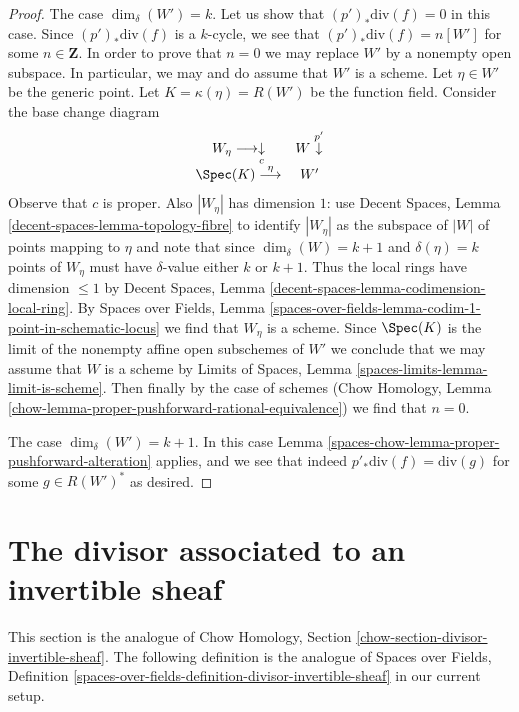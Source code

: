 \begin{proof}
\medskip\noindent
The case $\dim_\delta(W') = k$. Let us show that $(p')_*\text{div}(f) = 0$
in this case. Since $(p')_*\text{div}(f)$ is a $k$-cycle, we see
that $(p')_*\text{div}(f) = n[W']$ for some $n \in \mathbf{Z}$.
In order to prove that $n = 0$ we may replace $W'$ by
a nonempty open subspace. In particular, we may and
do assume that $W'$ is a scheme. Let $\eta \in W'$ be the generic point.
Let $K = \kappa(\eta) = R(W')$ be the function field.
Consider the base change diagram
$$
\begin{array}{cc}W_\eta \longrightarrow\underset{c}{\downarrow} & W \overset{p'}{\downarrow} \\ \Spec(K) \overset{\eta}{\longrightarrow} & W'\end{array}
$$
Observe that $c$ is proper. Also $|W_\eta|$ has dimension $1$:
use Decent Spaces, Lemma \ref{decent-spaces-lemma-topology-fibre}
to identify $|W_\eta|$ as the subspace of $|W|$ of points mapping to $\eta$
and note that since $\dim_\delta(W) = k + 1$ and $\delta(\eta) = k$
points of $W_\eta$ must have $\delta$-value either $k$ or $k + 1$.
Thus the local rings have dimension $\leq 1$ by
Decent Spaces, Lemma \ref{decent-spaces-lemma-codimension-local-ring}.
By Spaces over Fields, Lemma
\ref{spaces-over-fields-lemma-codim-1-point-in-schematic-locus}
we find that $W_\eta$ is a scheme.
Since $\Spec(K)$ is the limit of the nonempty affine open subschemes of $W'$
we conclude that we may assume that $W$ is a scheme by
Limits of Spaces, Lemma \ref{spaces-limits-lemma-limit-is-scheme}.
Then finally by the case of schemes
(Chow Homology, Lemma \ref{chow-lemma-proper-pushforward-rational-equivalence})
we find that $n = 0$.

\medskip\noindent
The case $\dim_\delta(W') = k + 1$. In this case
Lemma \ref{spaces-chow-lemma-proper-pushforward-alteration} applies,
and we see that indeed $p'_*\text{div}(f) = \text{div}(g)$
for some $g \in R(W')^*$ as desired.
\end{proof}

\section{The divisor associated to an invertible sheaf}
\label{spaces-chow-section-divisor-invertible-sheaf}
This section is the analogue of
Chow Homology, Section \ref{chow-section-divisor-invertible-sheaf}.
The following definition is the analogue of
Spaces over Fields, Definition
\ref{spaces-over-fields-definition-divisor-invertible-sheaf}
in our current setup.

